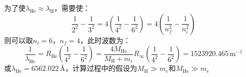 \documentclass[a4paper]{article}
\begin{document}
\begin{enumerate}
    为了使$\lambda_{\mathrm{He}} \approx \lambda_{\mathrm{H}}$，需要使：
    \[
        \frac{1}{2^2} - \frac{1}{3^2} = 4 \left(\frac{1}{4^2} - \frac{1}{6^2}\right) = 4 \left(\frac{1}{n_f^2} - \frac{1}{n_i^2}\right)
    \]
    则可以取$n_i=6$，$n_f=4$，此时波数为：
    \[
        \frac{1}{\lambda_{\mathrm{He}}} = R_{\mathrm{He}} \left(\frac{1}{4^2} - \frac{1}{6^2}\right) = \dfrac{4M_{\mathrm{He}}}{M_{\mathrm{H}} + m_e} R_\infty \left(\frac{1}{4^2} - \frac{1}{6^2}\right) = 1523920.465\,\mathrm{m^{-1}}
    \]
    或$\lambda_{\mathrm{He}}=6562.022\,\text{\AA}$，计算过程中的假设为$M_{\mathrm{H}} \gg m_e$和$M_{\mathrm{He}} \gg m_e$

\end{enumerate}
\end{document}

